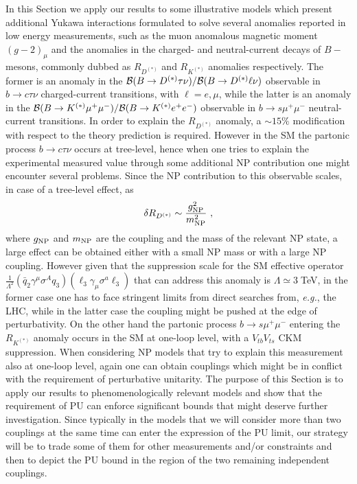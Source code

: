 \documentclass[a4paper,11pt]{article}
\newcommand{\be}{\begin{equation}}
\newcommand{\ee}{\end{equation}}
\begin{document}
In this Section we apply our results to some illustrative models which present additional Yukawa interactions formulated to solve several anomalies reported in low energy measurements, such as the muon anomalous magnetic moment $(g-2)_\mu$ and the anomalies in the charged- and neutral-current decays of $B-$mesons, commonly dubbed as $R_{D^{(*)}}$ and $R_{K^{(*)}}$ anomalies respectively. The former is an anomaly in the ${\cal B}(B\to D^{(*)} \tau \nu)/{\cal B}(B\to D^{(*)} \ell \nu)$
observable in $b\to c\tau \nu$ charged-current transitions, with $\ell=e,\mu$, while the latter is an anomaly in the ${\cal B}(B\to K^{(*)} \mu^+\mu^-)/{\cal B}(B\to K^{(*)} e^+e^-)$ observable in $b\to s \mu^+\mu^-$ neutral-current transitions.  In order to explain the $R_{D^{(*)}}$ anomaly, a  $\sim 15\%$ modification with respect to the theory prediction is required. However in the SM the partonic process $b\to c\tau \nu$ occurs at tree-level, hence when one tries to explain the experimental measured value through some additional NP contribution one might encounter several problems. Since the NP contribution to this observable  scales, in case of a tree-level effect, as
\be
\delta R_{D^{(*)}} \sim \dfrac{g_{{\rm NP}}^2}{m^2_{\rm NP}}  \ ,
\ee
where $g_{{\rm NP}}$ and $m_{{\rm NP}}$ are the coupling and the mass of the relevant NP state, a large effect can be obtained either with a small NP mass or with a large NP coupling. However given that the suppression scale for the SM effective operator  $\frac{1}{\Lambda^2}(\bar q_2 \gamma^\mu \sigma^A q_3)(\ell_3 \gamma_\mu \sigma^a \ell_3)$ that can address this anomaly is $\Lambda\simeq 3\;$TeV, in the former case one has to face stringent limits from direct searches from, {\emph{e.g.}}, the LHC, while in the latter case the coupling might be pushed at the edge of perturbativity.
On the other hand the partonic process $b\to s\mu^+\mu^-$ entering the $R_{K^{(*)}}$ anomaly occurs in the SM at one-loop level, with a $V_{tb}V_{ts}$ CKM suppression. When considering NP models that try to explain this measurement also at one-loop level, again one can obtain couplings which might be in conflict with the requirement of perturbative unitarity.
The purpose of this Section is to apply our results to phenomenologically relevant models and show that the requirement of PU can enforce significant bounds that might deserve further investigation.
 Since typically in the models that we will consider more than two couplings at the same time can enter the expression of the PU limit, our strategy will be to trade some of them for other measurements and/or constraints and then to depict the PU bound in the region of the two remaining independent couplings.
\end{document}
